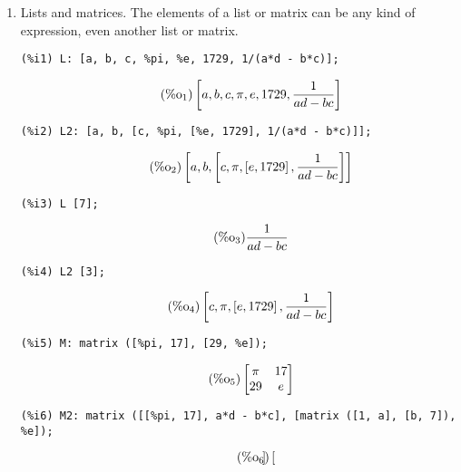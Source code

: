 \documentclass[12pt,leqno]{article}
\begin{document}
\begin{enumerate}
\item Lists and matrices.
The elements of a list or matrix can be any kind of expression,
even another list or matrix.
\begin{verbatim}
(%i1) L: [a, b, c, %pi, %e, 1729, 1/(a*d - b*c)];
\end{verbatim}
\begin{equation}
\tag{$\mathop{\mathrm{\%o}_{1}}$}\left[a, b, c, \pi, e, 1729, \frac{1}{a d-b c}\right]
\label{eq:doc-group1-code8-1-1}
\end{equation}
\begin{verbatim}
(%i2) L2: [a, b, [c, %pi, [%e, 1729], 1/(a*d - b*c)]];
\end{verbatim}
\begin{equation}
\tag{$\mathop{\mathrm{\%o}_{2}}$}\left[a, b, \left[c, \pi, \left[e, 1729\right], \frac{1}{a d-b c}\right]\right]
\label{eq:doc-group1-code8-2-1}
\end{equation}
\begin{verbatim}
(%i3) L [7];
\end{verbatim}
\begin{equation}
\tag{$\mathop{\mathrm{\%o}_{3}}$}\frac{1}{a d-b c}
\label{eq:doc-group1-code8-3-1}
\end{equation}
\begin{verbatim}
(%i4) L2 [3];
\end{verbatim}
\begin{equation}
\tag{$\mathop{\mathrm{\%o}_{4}}$}\left[c, \pi, \left[e, 1729\right], \frac{1}{a d-b c}\right]
\label{eq:doc-group1-code8-4-1}
\end{equation}
\begin{verbatim}
(%i5) M: matrix ([%pi, 17], [29, %e]);
\end{verbatim}
\begin{equation}
\tag{$\mathop{\mathrm{\%o}_{5}}$}\begin{bmatrix}
\pi & 17\\
29 & e\\
\end{bmatrix}
\label{eq:doc-group1-code8-5-1}
\end{equation}
\begin{verbatim}
(%i6) M2: matrix ([[%pi, 17], a*d - b*c], [matrix ([1, a], [b, 7]), %e]);
\end{verbatim}
\begin{equation}
\tag{$\mathop{\mathrm{\%o}_{6}}$}\begin{bmatrix}

\end{bmatrix}
\end{equation}
\end{enumerate}
\end{document}
